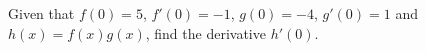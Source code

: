 Given that  $f(0)=5$, $f'(0)=-1$, $g(0)=-4$, $g'(0)=1$ and $h(x)=f(x)g(x)$, find the derivative $h'(0)$.

